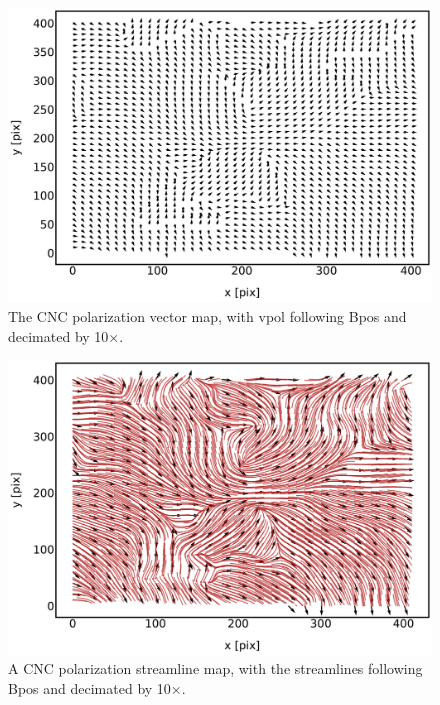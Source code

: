 \begin{figure}[!htbp]
\centering
\includegraphics[width=\textwidth]{figures/carina/vectors_10}
\caption[The CNC polarization vector map, decimated by 10\macrocapwrap{$\times$}.]{The CNC polarization vector map, with \gls{vpol} following \gls{Bpos} and decimated by 10$\times$.}
\label{fig:vectors_10}
\end{figure}

\begin{figure}[!htbp]
\centering
\includegraphics[width=\textwidth]{figures/carina/vector_sl_21_ds10}
\caption[The CNC polarization-streamline map, with streamlines decimated by 10\macrocapwrap{$\times$}.]{A CNC polarization streamline map, with the streamlines following \gls{Bpos} and decimated by 10$\times$.}
\label{fig:vector_sl_21_ds10}
\end{figure}


